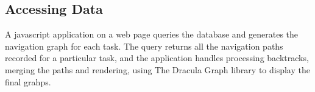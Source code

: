 \subsection{Accessing Data}

A javascript application on a web page queries the database and generates the navigation graph for
each task. The query returns all the navigation paths recorded for a particular task, and the application
handles processing backtracks, merging the paths and rendering, using The Dracula Graph library \cite{dracula-graph} to display the final grahps.